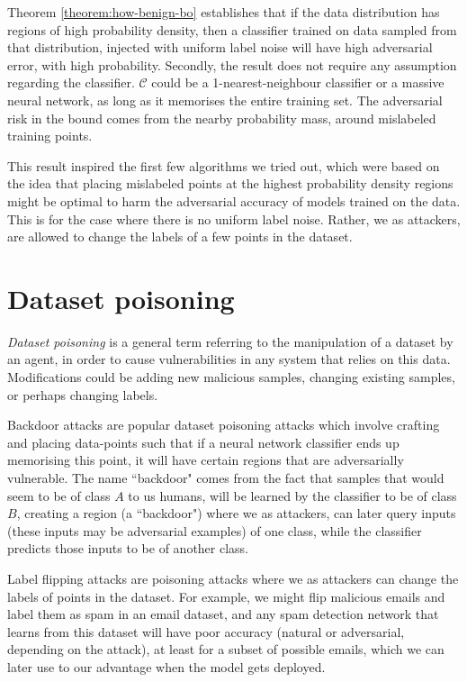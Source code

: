 \documentclass{ociamthesis}
\begin{document}
Theorem \ref{theorem:how-benign-bo} establishes that if the data distribution
has regions of high probability density, then a classifier trained on data
sampled from that distribution, injected with uniform label noise will have high
adversarial error, with high probability. Secondly, the result does not require
any assumption regarding the classifier. $\mathcal{C}$ could be a
1-nearest-neighbour classifier or a massive neural network, as long as it
memorises the entire training set. The adversarial risk in the bound comes from
the nearby probability mass, around mislabeled training points.


This result inspired the first few algorithms we tried out, which were based on
the idea that placing mislabeled points at the highest probability density
regions might be optimal to harm the adversarial accuracy of models trained on
the data. This is for the case where there is no uniform label noise. Rather, we
as attackers, are allowed to change the labels of a few points in the dataset.


\section{Dataset poisoning}
\emph{Dataset poisoning} \citep{just-how-toxic,
DBLP:journals/corr/abs-1712-05526} is a general term referring to the
manipulation of a dataset by an agent, in order to cause vulnerabilities in any
system that relies on this data. Modifications could be adding new malicious
samples, changing existing samples, or perhaps changing labels.

Backdoor attacks
\citep{DBLP:journals/corr/abs-1712-05526,hidden-trigger-backdoor,transferable-clean-label-poisoning}
are popular dataset poisoning attacks which involve crafting and placing
data-points such that if a neural network classifier ends up memorising this
point, it will have certain regions that are adversarially vulnerable. The name
``backdoor" comes from the fact that samples that would seem to be of class $A$
to us humans, will be learned by the classifier to be of class $B$, creating a
region (a ``backdoor") where we as attackers, can later query inputs (these
inputs may be adversarial examples) of one class, while the classifier predicts
those inputs to be of another class.

Label flipping attacks \citep{label-flip-SVMs,certified-robustness} are
poisoning attacks where we as attackers can change the labels of points in the
dataset. For example, we might flip malicious emails and label them as spam in
an email dataset, and any spam detection network that learns from this dataset
will have poor accuracy (natural or adversarial, depending on the attack), at
least for a subset of possible emails, which we can later use to our advantage
when the model gets deployed.
\end{document}

